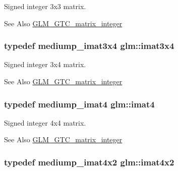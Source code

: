 Signed integer 3x3 matrix. 

\begin{DoxySeeAlso}{See Also}
\hyperlink{group__gtc__matrix__integer}{G\-L\-M\-\_\-\-G\-T\-C\-\_\-matrix\-\_\-integer} 
\end{DoxySeeAlso}
\hypertarget{group__gtc__matrix__integer_gaee5507e6cbbdd05841a0c174e60dd036}{
\subsubsection[{imat3x4}]{\setlength{\rightskip}{0pt plus 5cm}typedef mediump\-\_\-imat3x4 {\bf glm\-::imat3x4}}}\label{group__gtc__matrix__integer_gaee5507e6cbbdd05841a0c174e60dd036}


Signed integer 3x4 matrix. 

\begin{DoxySeeAlso}{See Also}
\hyperlink{group__gtc__matrix__integer}{G\-L\-M\-\_\-\-G\-T\-C\-\_\-matrix\-\_\-integer} 
\end{DoxySeeAlso}
\hypertarget{group__gtc__matrix__integer_ga40fc5c5e0b07543497aa1c314891544a}{
\subsubsection[{imat4}]{\setlength{\rightskip}{0pt plus 5cm}typedef mediump\-\_\-imat4 {\bf glm\-::imat4}}}\label{group__gtc__matrix__integer_ga40fc5c5e0b07543497aa1c314891544a}


Signed integer 4x4 matrix. 

\begin{DoxySeeAlso}{See Also}
\hyperlink{group__gtc__matrix__integer}{G\-L\-M\-\_\-\-G\-T\-C\-\_\-matrix\-\_\-integer} 
\end{DoxySeeAlso}
\hypertarget{group__gtc__matrix__integer_ga7e733984837e0e7aa9f4aac18f632f63}{
\subsubsection[{imat4x2}]{\setlength{\rightskip}{0pt plus 5cm}typedef mediump\-\_\-imat4x2 {\bf glm\-::imat4x2}}}\label{group__gtc__matrix__integer_ga7e733984837e0e7aa9f4aac18f632f63}


